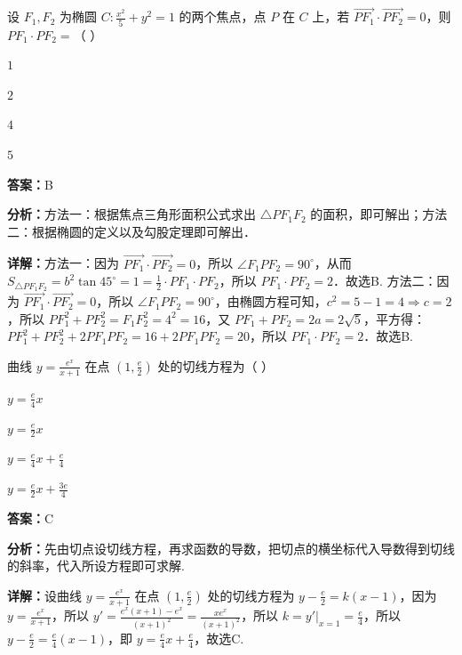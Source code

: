 \begin{question}[points=5]
设 $F_1, F_2$ 为椭圆 $C: \frac{x^2}{5}+y^2=1$ 的两个焦点，点 $P$ 在 $C$ 上，若 $\overrightarrow{PF_1} \cdot \overrightarrow{PF_2}=0$，则 $PF_1 \cdot PF_2 =$（    ）
\begin{choices}
  \item $1$
  \item $2$
  \item $4$
  \item $5$
\end{choices}
\begin{solution}
\textbf{答案：}B

\textbf{分析：}方法一：根据焦点三角形面积公式求出 $\triangle PF_1F_2$ 的面积，即可解出；方法二：根据椭圆的定义以及勾股定理即可解出．

\textbf{详解：}方法一：因为 $\overrightarrow{PF_1} \cdot \overrightarrow{PF_2}=0$，所以 $\angle F_1PF_2=90^\circ$，从而 $S_{\triangle PF_1F_2} = b^2\tan45^\circ = 1 = \frac{1}{2} \cdot PF_1 \cdot PF_2$，所以 $PF_1 \cdot PF_2 = 2$．故选B.
方法二：因为 $\overrightarrow{PF_1} \cdot \overrightarrow{PF_2}=0$，所以 $\angle F_1PF_2=90^\circ$，由椭圆方程可知，$c^2=5-1=4 \Rightarrow c=2$，所以 $PF_1^2+PF_2^2 = F_1F_2^2 = 4^2=16$，又 $PF_1+PF_2=2a=2\sqrt{5}$，平方得：$PF_1^2+PF_2^2+2PF_1PF_2=16+2PF_1PF_2=20$，所以 $PF_1 \cdot PF_2=2$．故选B.
\end{solution}
\end{question}

\begin{question}[points=5]
曲线 $y = \frac{e^x}{x+1}$ 在点 $\left(1, \frac{e}{2}\right)$ 处的切线方程为（    ）
\begin{choices}
  \item $y = \frac{e}{4}x$
  \item $y = \frac{e}{2}x$
  \item $y = \frac{e}{4}x + \frac{e}{4}$
  \item $y = \frac{e}{2}x + \frac{3e}{4}$
\end{choices}
\begin{solution}
\textbf{答案：}C

\textbf{分析：}先由切点设切线方程，再求函数的导数，把切点的横坐标代入导数得到切线的斜率，代入所设方程即可求解.

\textbf{详解：}设曲线 $y = \frac{e^x}{x+1}$ 在点 $\left(1, \frac{e}{2}\right)$ 处的切线方程为 $y - \frac{e}{2} = k(x-1)$，因为 $y = \frac{e^x}{x+1}$，所以 $y' = \frac{e^x(x+1)-e^x}{(x+1)^2} = \frac{xe^x}{(x+1)^2}$，所以 $k = y'|_{x=1}= \frac{e}{4}$，所以 $y - \frac{e}{2} = \frac{e}{4}(x-1)$，即 $y = \frac{e}{4}x + \frac{e}{4}$，故选C.
\end{solution}
\end{question}

